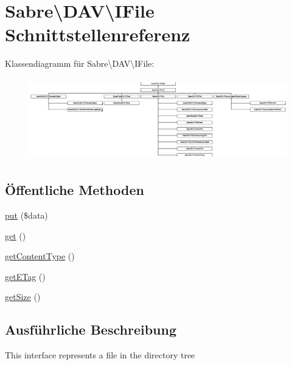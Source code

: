\hypertarget{interface_sabre_1_1_d_a_v_1_1_i_file}{}\section{Sabre\textbackslash{}D\+AV\textbackslash{}I\+File Schnittstellenreferenz}
\label{interface_sabre_1_1_d_a_v_1_1_i_file}
Klassendiagramm für Sabre\textbackslash{}D\+AV\textbackslash{}I\+File\+:\begin{figure}[H]
\begin{center}
\leavevmode
\includegraphics[height=3.582089cm]{interface_sabre_1_1_d_a_v_1_1_i_file}
\end{center}
\end{figure}
\subsection*{Öffentliche Methoden}
\begin{DoxyCompactItemize}
\item 
\mbox{\hyperlink{interface_sabre_1_1_d_a_v_1_1_i_file_a0c30bc87b22d289f311c854f23993452}{put}} (\$data)
\item 
\mbox{\hyperlink{interface_sabre_1_1_d_a_v_1_1_i_file_a3102812af0567c3cfd9cd6c20104bd27}{get}} ()
\item 
\mbox{\hyperlink{interface_sabre_1_1_d_a_v_1_1_i_file_aa76147e3e0ad228026dcb03035b499bc}{get\+Content\+Type}} ()
\item 
\mbox{\hyperlink{interface_sabre_1_1_d_a_v_1_1_i_file_a2b207a6037dcbd4e7373b977dc60117f}{get\+E\+Tag}} ()
\item 
\mbox{\hyperlink{interface_sabre_1_1_d_a_v_1_1_i_file_aa1534e00805f45d9282de9c699dbe178}{get\+Size}} ()
\end{DoxyCompactItemize}


\subsection{Ausführliche Beschreibung}
This interface represents a file in the directory tree


